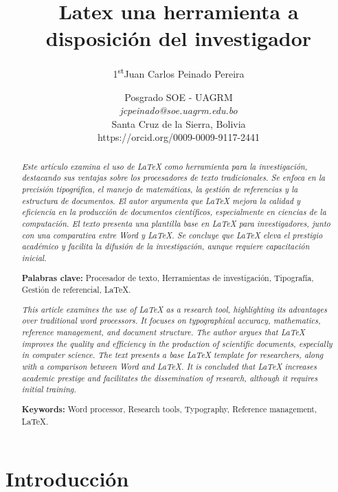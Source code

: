 \documentclass[10pt]{article}
\title{\Huge Latex una herramienta a disposición del investigador\\}
\author{\Large {1\textsuperscript{st}Juan Carlos Peinado Pereira}}
\date{\normalsize Posgrado SOE - UAGRM\\
\textit{jcpeinado@soe.uagrm.edu.bo}\\
Santa Cruz de la Sierra, Bolivia \\
https://orcid.org/0009-0009-9117-2441}
\begin{document}
\maketitle

\begin{abstract}
    \textit{\normalsize Este artículo examina el uso de LaTeX como herramienta para la investigación, destacando sus ventajas sobre los procesadores de texto tradicionales. 
    Se enfoca en la precisión tipográfica, el manejo de matemáticas, la gestión de referencias y la estructura de documentos. 
    El autor argumenta que LaTeX mejora la calidad y eficiencia en la producción de documentos científicos, especialmente en ciencias de la computación. El texto presenta una plantilla base en LaTeX para investigadores, junto con una comparativa entre Word y LaTeX.
    Se concluye que LaTeX eleva el prestigio académico y facilita la difusión de la investigación, aunque requiere capacitación inicial.} 
    \vspace{0.5cm}

    \textbf{Palabras clave:} Procesador de texto, Herramientas de investigación, Tipografía, Gestión de referencial, LaTeX.
\end{abstract}


\begin{abstract}
    \textit{\normalsize This article examines the use of LaTeX as a research tool, highlighting its advantages over traditional word processors. 
    It focuses on typographical accuracy, mathematics, reference management, and document structure. 
    The author argues that LaTeX improves the quality and efficiency in the production of scientific documents, especially in computer science. 
    The text presents a base LaTeX template for researchers, along with a comparison between Word and LaTeX. 
    It is concluded that LaTeX increases academic prestige and facilitates the dissemination of research, although it requires initial training.}    
    \vspace{0.5cm}

    \textbf{Keywords:} Word processor, Research tools, Typography, Reference management, LaTeX.
\end{abstract}


    \section{Introducción}
\end{document}
